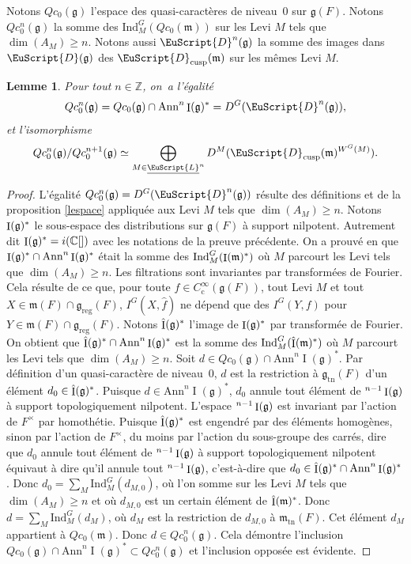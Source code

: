 \documentclass[JEP,XML,SOM,Unicode,francais]{cedram}
\let\mathcal \EuScript
\newcommand{\NoChangel}[1]{%
\expandafter\let\csname old\string#1\endcsname=#1
\let#1=\relax
\newcommand{#1}{\mathcode`l="716C\csname old\string#1\endcsname\mathcode`l="7160 }%
}
\newcommand{\frg}{\mathfrak{g}}
\newcommand{\mfrm}{\mathfrak{m}}
\newcommand{\Ann}{\mathrm{Ann}}
\newcommand{\rc}{\mathrm{c}}
\newcommand{\cusp}{\mathrm{cusp}}
\newcommand{\Fil}{\mathrm{Fil}} \NoChangel{\Fil}
\newcommand{\Ind}{\mathrm{Ind}}
\newcommand{\nil}{\mathrm{nil}} \NoChangel{\nil}
\newcommand{\Nil}{\mathrm{Nil}} \NoChangel{\Nil}
\newcommand{\reg}{\mathrm{reg}}
\newcommand{\tn}{\mathrm{tn}}
\DeclareMathOperator{\rI}{I}
\newcommand{\cD}{\mathcal{D}}
\newcommand{\cL}{\mathcal{L}}
\newcommand{\CC}{\mathbb{C}}
\newcommand{\ZZ}{\mathbb{Z}}
\theoremstyle{plain}
\newtheorem*{lem*}{Lemme}
\theoremstyle{definition}
\begin{document}
Notons $Qc_{0}(\frg)$ l'espace des quasi-caractères de niveau~$0$ sur $\frg(F)$. Notons $Qc_{0}^n(\frg)$ la somme des $\Ind_{M}^G(Qc_{0}(\mfrm))$ sur les Levi $M$ tels que $\dim(A_{M})\geq n$. Notons aussi $\cD^n(\frg)$ la somme des images dans $\cD(\frg)$ des $\cD_{\cusp}(\mfrm)$ sur les mêmes Levi $M$.

\begin{lem*}
Pour tout $n\in \ZZ$, on~a l'égalité
\[
Qc_{0}^n(\frg)=Qc_{0}(\frg)\cap \Ann^n\rI(\frg)^*=D^G(\cD^n(\frg)),
\]
et l'isomorphisme
\[
Qc_{0}^n(\frg)/Qc_{0}^{n+1}(\frg)\simeq \bigoplus_{M\in \underline{\cL}^n}D^M(\cD_{\cusp}(\mfrm)^{W^G(M)}).
\]
\end{lem*}

\begin{proof}
L'égalité $Qc_{0}^n(\frg)=D^G(\cD^n(\frg))$ résulte des définitions et de la proposition \ref{lespace} appliquée aux Levi $M$ tels que $\dim(A_{M})\geq n$. Notons $\rI(\frg)^*_{\nil}$ le sous-espace des distributions sur $\frg(F)$ à support nilpotent. Autrement dit $\rI(\frg)^*_{\nil}=i(\CC[\Nil])$ avec les notations de la preuve précédente. On a prouvé en \cite[Prop.\,I.5.3]{MW} que $\rI(\frg)^*_{\nil}\cap \Ann^n\rI(\frg)^*$ était la somme des $\Ind_{M}^G(\rI(\mfrm)^*_{\nil})$ où $M$ parcourt les Levi tels que $\dim(A_{M})\geq n$. Les filtrations sont invariantes par transformées de Fourier. Cela résulte de ce que, pour toute $f\in C_{\rc}^{\infty}(\frg(F))$, tout Levi $M$ et tout $X\in \mfrm(F)\cap \frg_{\reg}(F)$, $I^G(X,\hat{f})$ ne dépend que des $I^G(Y,f)$ pour $Y\in \mfrm(F)\cap \frg_{\reg}(F)$. Notons $\hat{\rI}(\frg)^*_{\nil}$ l'image de $\rI(\frg)^*_{\nil}$ par transformée de Fourier. On obtient que $\hat{\rI}(\frg)^*_{\nil}\cap \Ann^n\rI(\frg)^*$ est la somme des $\Ind_{M}^G(\hat{\rI}(\mfrm)^*_{\nil})$ où $M$ parcourt les Levi tels que $\dim(A_{M})\geq n$. Soit $d\in Qc_{0}(\frg)\cap \Ann^n\rI(\frg)^* $. Par définition d'un quasi-caractère de niveau~$0$, $d$ est la restriction à $\frg_{\tn}(F)$ d'un élément $d_{0}\in \hat{\rI}(\frg)^*_{\nil}$. Puisque $d\in \Ann^n\rI(\frg)^*$, $d_{0}$ annule tout élément de $\Fil^{n-1}\rI(\frg)$ à support topologiquement nilpotent. L'espace $\Fil^{n-1}\rI(\frg)$ est invariant par l'action de $F^{\times}$ par homothétie. Puisque $\hat{\rI}(\frg)^*_{\nil}$ est engendré par des éléments homogènes, sinon par l'action de $F^{\times}$, du moins par l'action du sous-groupe des carrés, dire que $d_{0}$ annule tout élément de $\Fil^{n-1}\rI(\frg)$ à support topologiquement nilpotent équivaut à dire qu'il annule tout $\Fil^{n-1}\rI(\frg)$, c'est-à-dire que $d_{0}\in \hat{\rI}(\frg)^*_{\nil}\cap \Ann^n\rI(\frg)^*$. Donc $d_{0}=\sum_{M}\Ind_{M}^G(d_{M,0})$, où l'on somme sur les Levi $M$ tels que $\dim(A_{M})\geq n$ et où $d_{M,0}$ est un certain élément de $\hat{\rI}(\mfrm)^*_{\nil}$. Donc $d= \sum_{M}\Ind_{M}^G(d_{M})$, où $d_{M}$ est la restriction de $d_{M,0}$ à $\mfrm_{\tn}(F)$. Cet élément $d_{M}$ appartient à $Qc_{0}(\mfrm)$. Donc $d\in Qc_{0}^n(\frg)$. Cela démontre l'inclusion $Qc_{0}(\frg)\cap \Ann^n\rI(\frg)^*\subset Qc_{0}^n(\frg)$ et l'inclusion opposée est évidente.


\end{proof}
\end{document}
